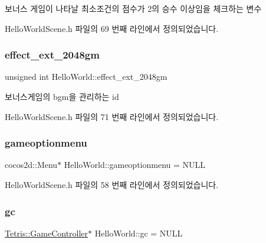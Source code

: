 보너스 게임이 나타날 최소조건의 점수가 2의 승수 이상임을 체크하는 변수 



Hello\+World\+Scene.\+h 파일의 69 번째 라인에서 정의되었습니다.

\mbox{\label{class_hello_world_a165832200ec4d9ee283167ac727eeade}} 
\subsubsection{\texorpdfstring{effect\+\_\+ext\+\_\+2048gm}{effect\_ext\_2048gm}}
{\footnotesize\ttfamily unsigned int Hello\+World\+::effect\+\_\+ext\+\_\+2048gm\hspace{0.3cm}{\ttfamily [protected]}}



보너스게임의 bgm을 관리하는 id 



Hello\+World\+Scene.\+h 파일의 71 번째 라인에서 정의되었습니다.

\mbox{\label{class_hello_world_aeb27a8750393a2d4982809b64454a045}} 
\subsubsection{\texorpdfstring{gameoptionmenu}{gameoptionmenu}}
{\footnotesize\ttfamily cocos2d\+::\+Menu$\ast$ Hello\+World\+::gameoptionmenu = N\+U\+LL\hspace{0.3cm}{\ttfamily [protected]}}



Hello\+World\+Scene.\+h 파일의 58 번째 라인에서 정의되었습니다.

\mbox{\label{class_hello_world_a547cb213126911d9a7151f8259dc7102}} 
\subsubsection{\texorpdfstring{gc}{gc}}
{\footnotesize\ttfamily \hyperlink{class_tetris_1_1_game_controller}{Tetris\+::\+Game\+Controller}$\ast$ Hello\+World\+::gc = N\+U\+LL\hspace{0.3cm}{\ttfamily [protected]}}



